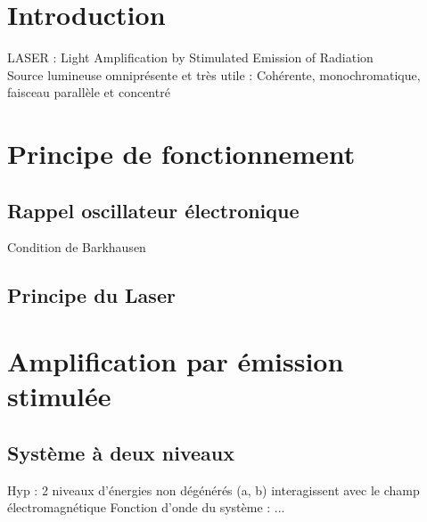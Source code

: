 


\biblio{}

\section*{Introduction}

LASER : Light Amplification by Stimulated Emission of Radiation \\
Source lumineuse omniprésente et très utile : Cohérente, monochromatique, faisceau parallèle et concentré



\section{Principe de fonctionnement}
\subsection{Rappel oscillateur électronique}
Condition de Barkhausen
\subsection{Principe du Laser}

\section{Amplification par émission stimulée}
\subsection{Système à deux niveaux}
Hyp : 2 niveaux d’énergies non dégénérés (a, b) interagissent avec le champ électromagnétique
Fonction d’onde du système : ...

